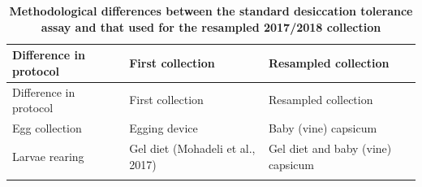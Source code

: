 \documentclass[]{article}
\begin{document}
\newpage

\begin{longtable}[]{@{}lll@{}}
\caption{\textbf{Methodological differences between the standard desiccation tolerance assay and that used for the resampled 2017/2018 collection}}\tabularnewline
\toprule
\begin{minipage}[b]{0.24\columnwidth}\raggedright\strut
Difference in protocol\strut
\end{minipage} & \begin{minipage}[b]{0.33\columnwidth}\raggedright\strut
First collection\strut
\end{minipage} & \begin{minipage}[b]{0.34\columnwidth}\raggedright\strut
Resampled collection\strut
\end{minipage}\tabularnewline
\midrule
\endfirsthead
\toprule
\begin{minipage}[b]{0.24\columnwidth}\raggedright\strut
Difference in protocol\strut
\end{minipage} & \begin{minipage}[b]{0.33\columnwidth}\raggedright\strut
First collection\strut
\end{minipage} & \begin{minipage}[b]{0.34\columnwidth}\raggedright\strut
Resampled collection\strut
\end{minipage}\tabularnewline
\midrule
\endhead
\begin{minipage}[t]{0.24\columnwidth}\raggedright\strut
Egg collection\strut
\end{minipage} & \begin{minipage}[t]{0.33\columnwidth}\raggedright\strut
Egging device\strut
\end{minipage} & \begin{minipage}[t]{0.34\columnwidth}\raggedright\strut
Baby (vine) capsicum\strut
\end{minipage}\tabularnewline
\begin{minipage}[t]{0.24\columnwidth}\raggedright\strut
Larvae rearing\strut
\end{minipage} & \begin{minipage}[t]{0.33\columnwidth}\raggedright\strut
Gel diet (Mohadeli et al., 2017)\strut
\end{minipage} & \begin{minipage}[t]{0.34\columnwidth}\raggedright\strut
Gel diet and baby (vine) capsicum\strut
\end{minipage}\tabularnewline
\begin{minipage}[t]{0.24\columnwidth}\raggedright\strut

\end{minipage}
\end{longtable}
\end{document}

